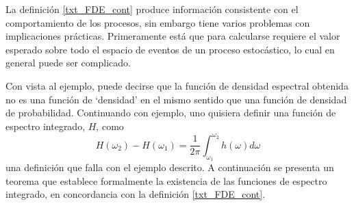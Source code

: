 \documentclass[12pt,letterpaper]{book}
\newcommand{\intR}{\int_{-\infty}^{\infty}}
\newcommand{\SEN}[1]{\mathrm{sen}\left( #1 \right)}
\begin{document}
La definición \ref{txt_FDE_cont} produce información consistente con el comportamiento de los procesos, sin embargo tiene varios problemas con implicaciones prácticas.
%
Primeramente está que para calcularse requiere el valor esperado sobre todo el espacio de eventos de un proceso estocástico, lo cual en general puede ser complicado.

Con vista al ejemplo, puede decirse que la función de densidad espectral obtenida no es una función de `densidad' en el mismo sentido que una función de densidad de probabilidad.
%
Continuando con ejemplo, uno quisiera definir una función de espectro integrado, $H$, como
\begin{equation}
H(\omega_2) - H(\omega_1) = \frac{1}{2 \pi} \int_{\omega_1}^{\omega_2} h(\omega) d\omega
\end{equation}
una definición que falla con el ejemplo descrito. A continuación se presenta un teorema que establece formalmente la existencia de las funciones de espectro integrado, en concordancia con la definición \ref{txt_FDE_cont}.



\end{document}
